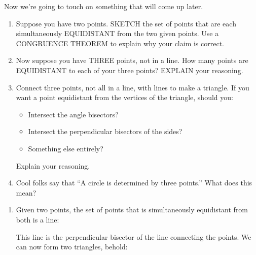 \documentclass[nooutcomes,noauthor,handout]{ximera}
\begin{document}
\begin{question}
  Now we're going to touch on something that will come up later.
  \begin{enumerate}
  \item Suppose you have two points. SKETCH the set of points that are
    each simultaneously EQUIDISTANT from the two given points. Use a
    CONGRUENCE THEOREM to explain why your claim is correct.
  \item Now suppose you have THREE points, not in a line. How many
    points are EQUIDISTANT to each of your three points? EXPLAIN your
    reasoning.
  \item Connect three points, not all in a line, with lines to make a
    triangle. If you want a point equidistant from the vertices of the
    triangle, should you:
    \begin{itemize}
    \item Intersect the angle bisectors?
    \item Intersect the perpendicular bisectors of the sides?
    \item Something else entirely?
    \end{itemize}
    Explain your reasoning.
  \item Cool folks say that ``A circle is determined by three
    points.'' What does this mean?
  \end{enumerate}
  \begin{freeResponse}
    \begin{enumerate}
    \item Given two points, the set of points that is simultaneously
      equidistant from both is a line:
      \begin{center}
      \end{center}
      This line is the perpendicular bisector of the line connecting
      the points. We can now form two triangles, behold:
      \begin{center}
\end{center}
\end{enumerate}
\end{freeResponse}
\end{question}
\end{document}

